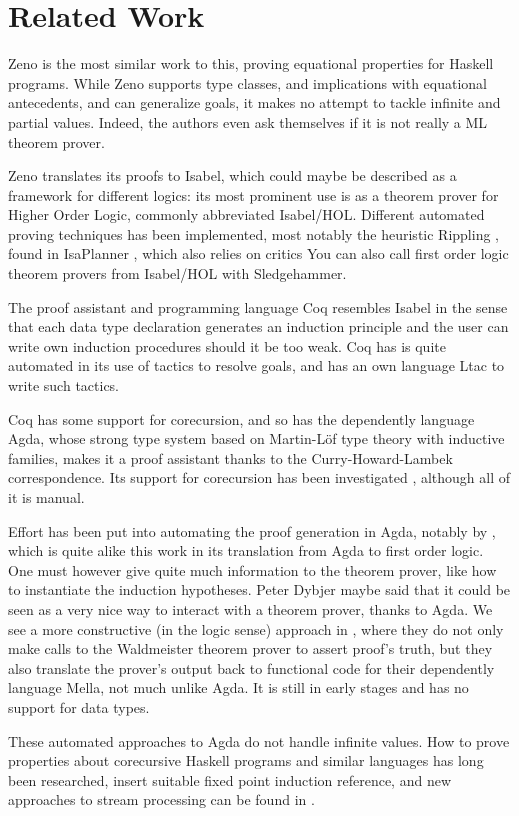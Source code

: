 \section{Related Work}


Zeno \cite{zeno} is the most similar work to this, proving equational
properties for Haskell programs. While Zeno supports type classes, and
implications with equational antecedents, and can generalize goals, it
makes no attempt to tackle infinite and partial values. Indeed, the
authors even ask themselves if it is not really a ML theorem prover.

Zeno translates its proofs to Isabel, which could maybe be described
as a framework for different logics: its most prominent use is as a
theorem prover for Higher Order Logic, commonly abbreviated
Isabel/HOL. Different automated proving techniques has been
implemented, most notably the heuristic Rippling \cite{dixonphd},
found in IsaPlanner \cite{isaplanner}, which also relies on critics
\cite{productiveuse} You can also call first order logic theorem
provers from Isabel/HOL with Sledgehammer.

The proof assistant and programming language Coq resembles Isabel in
the sense that each data type declaration generates an induction
principle and the user can write own induction procedures should it be
too weak. Coq has is quite automated in its use of tactics to resolve
goals, and has an own language Ltac to write such tactics.

Coq has some support for corecursion, and so has the dependently
language Agda, whose strong type system based on Martin-Löf type
theory with inductive families, makes it a proof assistant thanks to
the Curry-Howard-Lambek correspondence. Its support for corecursion
has been investigated \cite{productivity}, although all of it is
manual.

Effort has been put into automating the proof generation in Agda,
notably by \cite{agdaatp}, which is quite alike this work in its
translation from Agda to first order logic. One must however give
quite much information to the theorem prover, like how to instantiate
the induction hypotheses. Peter Dybjer maybe said that it could be
seen as a very nice way to interact with a theorem prover, thanks to
Agda. We see a more constructive (in the logic sense) approach in
\cite{dtatp}, where they do not only make calls to the Waldmeister
theorem prover to assert proof's truth, but they also translate the
prover's output back to functional code for their dependently language
Mella, not much unlike Agda. It is still in early stages and has no
support for data types.

These automated approaches to Agda do not handle infinite values. How
to prove properties about corecursive Haskell programs and similar
languages has long been researched, insert suitable fixed point
induction reference, and new approaches to stream processing can be
found in \cite{streams}.
